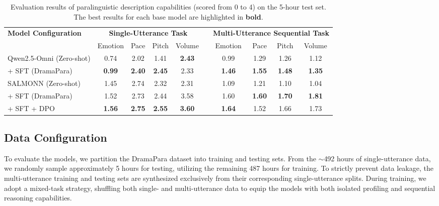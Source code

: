 \documentclass{Interspeech}
\begin{document}
\begin{table}[th]
  \caption{Evaluation results of paralinguistic description capabilities (scored from 0 to 4) on the 5-hour test set. The best results for each base model are highlighted in \textbf{bold}.}
  \label{tab:main_results}
  \centering
  \begin{tabular}{l cccc c cccc}
    \toprule
    \multirow{2}{*}{\textbf{Model Configuration}} & \multicolumn{4}{c}{\textbf{Single-Utterance Task}} && \multicolumn{4}{c}{\textbf{Multi-Utterance Sequential Task}} \\
    \cmidrule{2-5} \cmidrule{7-10}
    & Emotion & Pace & Pitch & Volume && Emotion & Pace & Pitch & Volume \\
    \midrule
    Qwen2.5-Omni (Zero-shot) & 0.74 & 2.02 & 1.41 & \textbf{2.43} && 0.99 & 1.29 & 1.26 & 1.12 \\
    \quad + SFT (DramaPara) & \textbf{0.99} & \textbf{2.40} & \textbf{2.45} & 2.33 && \textbf{1.46} & \textbf{1.55} & \textbf{1.48} & \textbf{1.35} \\
    \midrule
    SALMONN (Zero-shot) & 1.45 & 2.74 & 2.32 & 2.31 && 1.09 & 1.21 & 1.10 & 1.04 \\
    \quad + SFT (DramaPara) & 1.52 & 2.73 & 2.44 & 3.58 && 1.60 & \textbf{1.60} & \textbf{1.70} & \textbf{1.81} \\
    \quad + SFT + DPO & \textbf{1.56} & \textbf{2.75} & \textbf{2.55} & \textbf{3.60} && \textbf{1.64} & 1.52 & 1.66 & 1.73 \\
    \bottomrule
  \end{tabular}
\vspace{-0.3cm}
\end{table}

\subsection{Data Configuration}
To evaluate the models, we partition the DramaPara dataset into training and testing sets. From the $\sim$492 hours of single-utterance data, we randomly sample approximately 5 hours for testing, utilizing the remaining 487 hours for training. To strictly prevent data leakage, the multi-utterance training and testing sets are synthesized exclusively from their corresponding single-utterance splits. During training, we adopt a mixed-task strategy, shuffling both single- and multi-utterance data to equip the models with both isolated profiling and sequential reasoning capabilities.
\end{document}
